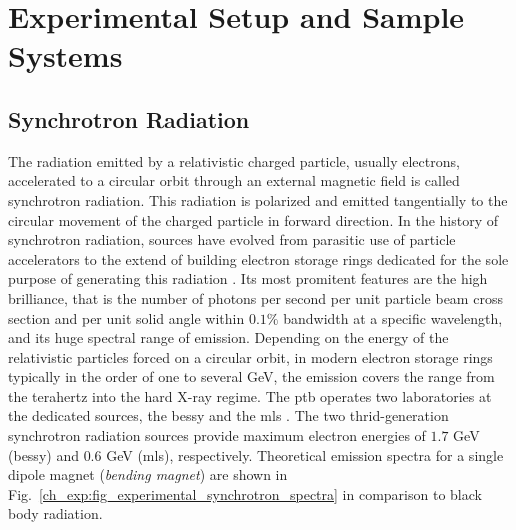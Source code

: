\chapter{Experimental Setup and Sample Systems} \label{ch_exp}

\section{Synchrotron Radiation}
The radiation emitted by a relativistic charged particle, usually electrons, accelerated to a circular orbit through an external magnetic field is called synchrotron radiation. This radiation is polarized and emitted tangentially to the circular movement of the charged particle in forward direction. In the history of synchrotron radiation, sources have evolved from parasitic use of particle accelerators to the extend of building electron storage rings dedicated for the sole purpose of generating this radiation \cite{munro_chapter_1987}. Its most promitent features are the high brilliance, that is the number of photons per second per unit particle beam cross section and per unit solid angle within $0.1\%$ bandwidth at a specific wavelength, and its huge spectral range of emission. Depending on the energy of the relativistic particles forced on a circular orbit, in modern electron storage rings typically in the order of one to several GeV, the emission covers the range from the terahertz into the hard X-ray regime. The \gls{ptb} operates two laboratories at the dedicated sources, the \gls{bessy} and the \gls{mls} \cite{brandt_metrology_2007}. The two thrid-generation synchrotron radiation sources provide maximum electron energies of $1.7$ GeV (\gls{bessy}) and $0.6$ GeV (\gls{mls}), respectively. Theoretical emission spectra for a single dipole magnet (\emph{bending magnet}) are shown in Fig.~\ref{ch_exp:fig_experimental_synchrotron_spectra} in comparison to black body radiation.
